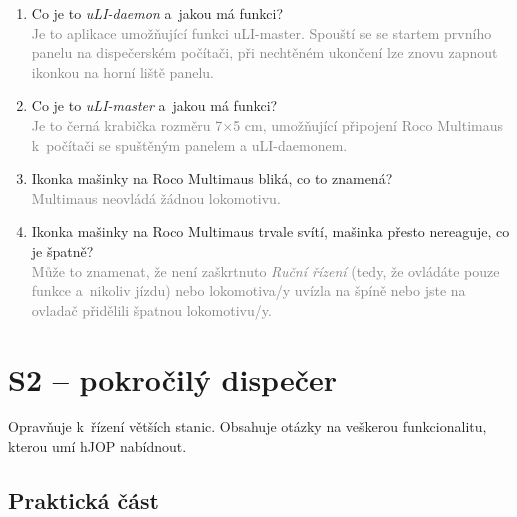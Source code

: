 \documentclass[12pt,a4paper]{article}
\newcommand{\solution}[1]{\\ \textcolor{gray}{#1}}
\newcommand{\solution}[1]{}
\begin{document}
\begin{enumerate}[leftmargin=*]

\item Co je to \textit{uLI-daemon} a~jakou má funkci?
\solution{Je to aplikace umožňující funkci uLI-master. Spouští se se startem
prvního panelu na dispečerském počítači, při nechtěném ukončení lze znovu
zapnout ikonkou na horní liště panelu.}

\item Co je to \textit{uLI-master} a~jakou má funkci?
\solution{Je to černá krabička rozměru 7×5 cm, umožňující připojení Roco
Multimaus k~počítači se spuštěným panelem a uLI-daemonem.}

\item Ikonka mašinky na Roco Multimaus bliká, co to znamená?
\solution{Multimaus neovládá žádnou lokomotivu.}

\item Ikonka mašinky na Roco Multimaus trvale svítí, mašinka přesto nereaguje,
co je špatně?
\solution{Může to znamenat, že není zaškrtnuto \textit{Ruční řízení} (tedy, že
ovládáte pouze funkce a~nikoliv jízdu) nebo lokomotiva/y uvízla na špíně nebo
jste na ovladač přidělili špatnou lokomotivu/y.}

\end{enumerate}


\newpage
\section{S2 – pokročilý dispečer}

Opravňuje k~řízení větších stanic. Obsahuje otázky na veškerou funkcionalitu,
kterou umí hJOP nabídnout.

\subsection{Praktická část}
\end{document}
